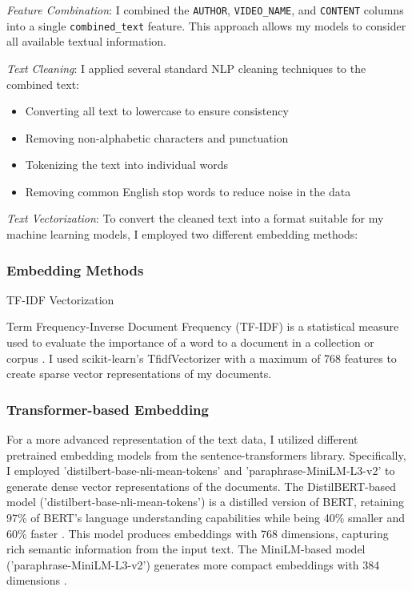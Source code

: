 \documentclass[conference]{IEEEtran}
\begin{document}
\textit{Feature Combination}: I combined the \verb|AUTHOR|, \verb|VIDEO_NAME|, and \verb|CONTENT| columns into a single \verb|combined_text| feature. This approach allows my models to consider all available textual information.

\textit{Text Cleaning}: I applied several standard NLP cleaning techniques to the combined text:
\begin{itemize}
\item Converting all text to lowercase to ensure consistency
\item Removing non-alphabetic characters and punctuation
\item Tokenizing the text into individual words
\item Removing common English stop words to reduce noise in the data
\end{itemize}

\textit{Text Vectorization}: To convert the cleaned text into a format suitable for my machine learning models, I employed two different embedding methods:

\subsubsection{Embedding Methods}
TF-IDF Vectorization

Term Frequency-Inverse Document Frequency (TF-IDF) is a statistical measure used to evaluate the importance of a word to a document in a collection or corpus \cite{b3}. I used scikit-learn's TfidfVectorizer with a maximum of 768 features to create sparse vector representations of my documents.
\subsubsection{Transformer-based Embedding}
For a more advanced representation of the text data, I utilized different pretrained embedding models from the sentence-transformers library. Specifically, I employed 'distilbert-base-nli-mean-tokens' and 'paraphrase-MiniLM-L3-v2' to generate dense vector representations of the documents. The DistilBERT-based model ('distilbert-base-nli-mean-tokens') is a distilled version of BERT, retaining 97\% of BERT's language understanding capabilities while being 40\% smaller and 60\% faster \cite{b4}. This model produces embeddings with 768 dimensions, capturing rich semantic information from the input text. The MiniLM-based model ('paraphrase-MiniLM-L3-v2') generates more compact embeddings with 384 dimensions \cite{b5}.
\end{document}
